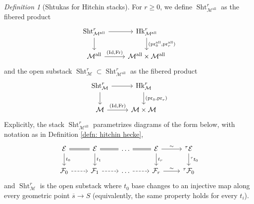 \documentclass[reqno]{amsart}
\numberwithin{equation}{section}
\newcommand\mnote[1]{\marginpar{\tiny #1}}
\newcommand{\ol}[1]{\overline{#1}}
\newcommand{\Cal}[1]{\mathcal{#1}}
\newcommand{\ft}{{}^{\tau}}
\DeclareMathOperator{\Frob}{Fr}
\DeclareMathOperator{\Id}{Id}
\DeclareMathOperator{\Sht}{Sht}
\DeclareMathOperator{\pr}{pr}
\DeclareMathOperator{\Hk}{Hk}
\DeclareMathOperator{\Ch}{Ch}
\DeclareMathOperator{\all}{all}
\newcommand\cM{\mathcal{M}}
\theoremstyle{remark}
\newtheorem{defn}[thm]{Definition}
\numberwithin{equation}{section}
\begin{document}
\begin{defn}[Shtukas for Hitchin stacks]\label{defn: hitchin shtuka}
For $r \geq 0$, we define $\Sht_{\Cal{M}^{\all}}^{r}$ as the fibered product 
\begin{equation}\label{eq: shtuka all as intersection}
\begin{tikzcd}
\Sht_{\Cal{M}^{\all}}^{r}  \ar[r] \ar[d] & \Hk_{\Cal{M}^{\all}}^{r} \ar[d, "{(\pr_0^{\all}, \pr_r^{\all})}"] \\
\Cal{M}^{\all} \ar[r, "{(\Id, \Frob)}"] & \Cal{M}^{\all}  \times \Cal{M}^{\all}
\end{tikzcd}
\end{equation}
and the open substack $\Sht_{\Cal{M}}^{r} \subset \Sht_{\Cal{M}^{\all}}^{r}$ as the fibered product 
\begin{equation}\label{eq: shtuka as intersection}
\begin{tikzcd}
\Sht_{\Cal{M}}^{r}  \ar[r] \ar[d] & \Hk_{\Cal{M}}^{r} \ar[d, "{(\pr_0, \pr_r)}"] \\
\Cal{M} \ar[r, "{(\Id, \Frob)}"] & \Cal{M}  \times \Cal{M}
\end{tikzcd}
\end{equation}
Explicitly, the stack $\Sht_{\Cal{M}^{\all}}^{r}$ parametrizes diagrams of the form below, with notation as in Definition \ref{defn: hitchin hecke},
\begin{equation}\label{eq: sht_M point}
\begin{tikzcd}
\Cal{E} \ar[d, "t_0"] \ar[r, equals] &  \Cal{E} \ar[r, equals]  \ar[d, "t_1"]& \ldots \ar[r, equals] & \Cal{E} \ar[r, "\sim"] \ar[d, "t_{r}"] & \ft \Cal{E} \ar[d, "\ft t_0"] \\
\Cal{F}_0 \ar[r, dashed] & \Cal{F}_1 \ar[r, dashed]  &  \ldots \ar[r, dashed] &  \Cal{F}_{r} \ar[r, "\sim"] & \ft \Cal{F}_0  
\end{tikzcd}
\end{equation}
and $\Sht_{\Cal{M}}^{r}$ is the open substack where $t_0$ base changes to an injective map along every geometric point $\ol{s} \rightarrow S$ (equivalently, the same property holds for every $t_i$). 

\end{defn}

\end{document}
